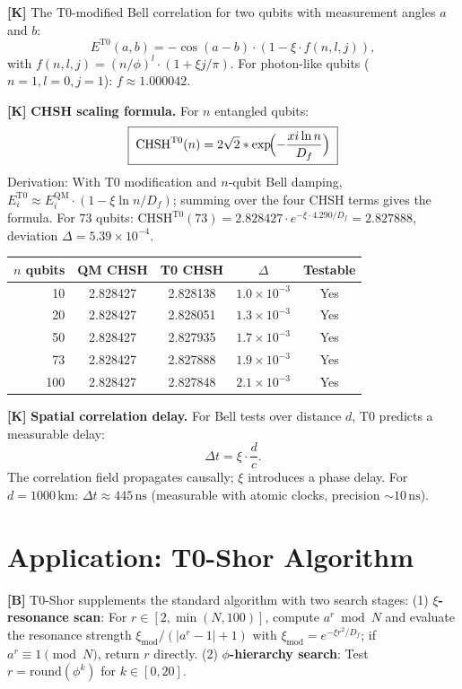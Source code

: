 \textbf{[K]} The T0-modified Bell correlation for two qubits with measurement
angles $a$ and $b$:
\[
  E^{\text{T0}}(a,b) = -\cos(a-b)\cdot(1-\xi\cdot f(n,l,j)),
\]
with $f(n,l,j)=(n/\phi)^l\cdot(1+\xi j/\pi)$. For photon-like qubits
($n=1,l=0,j=1$): $f\approx1{.}000042$.

\textbf{[K]} \textbf{CHSH scaling formula.} For $n$ entangled qubits:
\[
  \boxed{\;\text{CHSH}^{\text{T0}}(n)
  = 2\sqrt2\cdot\exp\!\Bigl(-\frac{\xi\ln n}{D_f}\Bigr)\;}
\]
Derivation: With T0 modification and $n$-qubit Bell damping,
$E_i^{\text{T0}}\approx E_i^{\text{QM}}\cdot(1-\xi\ln n/D_f)$; summing over
the four CHSH terms gives the formula. For 73 qubits:
$\text{CHSH}^{\text{T0}}(73) = 2{.}828427\cdot e^{-\xi\cdot4{.}290/D_f}
= 2{.}827888$, deviation $\Delta=5{.}39\times10^{-4}$.

\begin{center}
\renewcommand{\arraystretch}{1.3}
{\small
\begin{tabular}{rcccc}
\toprule
$n$ qubits & QM CHSH & T0 CHSH & $\Delta$ & Testable \\
\midrule
10  & 2.828427 & 2.828138 & $1{.}0\times10^{-3}$ & Yes \\
20  & 2.828427 & 2.828051 & $1{.}3\times10^{-3}$ & Yes \\
50  & 2.828427 & 2.827935 & $1{.}7\times10^{-3}$ & Yes \\
73  & 2.828427 & 2.827888 & $1{.}9\times10^{-3}$ & Yes \\
100 & 2.828427 & 2.827848 & $2{.}1\times10^{-3}$ & Yes \\
\bottomrule
\end{tabular}
}
\renewcommand{\arraystretch}{1.0}
\end{center}

\textbf{[K]} \textbf{Spatial correlation delay.} For Bell tests over distance
$d$, T0 predicts a measurable delay:
\[
  \Delta t = \xi\cdot\frac{d}{c}.
\]
The correlation field propagates causally; $\xi$ introduces a phase delay.
For $d=1000\,\text{km}$: $\Delta t\approx445\,\text{ns}$ (measurable with atomic
clocks, precision $\sim10\,\text{ns}$).

\section{Application: T0-Shor Algorithm}

\textbf{[B]} T0-Shor supplements the standard algorithm with two search stages:
(1) \textbf{$\xi$-resonance scan}: For $r\in[2,\min(N,100)]$, compute
$a^r\bmod N$ and evaluate the resonance strength
$\xi_\text{mod}/(|a^r-1|+1)$ with $\xi_\text{mod}=e^{-\xi r^2/D_f}$;
if $a^r\equiv1\pmod N$, return $r$ directly. (2) \textbf{$\phi$-hierarchy
search}: Test $r=\text{round}(\phi^k)$ for $k\in[0,20]$.

